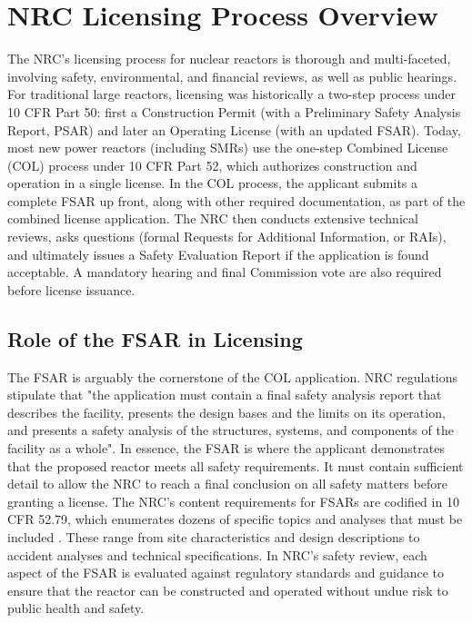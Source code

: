 \documentclass[5p,authoryear]{elsarticle}
\begin{document}
\section{NRC Licensing Process Overview} \label{NRC Licensing Process Overview}

The NRC’s licensing process for nuclear reactors is thorough and multi-faceted, involving safety, environmental, and financial reviews, as well as public hearings. For traditional large reactors, licensing was historically a two-step process under 10 CFR Part 50: first a Construction Permit (with a Preliminary Safety Analysis Report, PSAR) and later an Operating License (with an updated FSAR). Today, most new power reactors (including SMRs) use the one-step Combined License (COL) process under 10 CFR Part 52, which authorizes construction and operation in a single license. In the COL process, the applicant submits a complete FSAR up front, along with other required documentation, as part of the combined license application. The NRC then conducts extensive technical reviews, asks questions (formal Requests for Additional Information, or RAIs), and ultimately issues a Safety Evaluation Report if the application is found acceptable. A mandatory hearing and final Commission vote are also required before license issuance.

\subsection{Role of the FSAR in Licensing}
\vspace{0.2cm}

The FSAR is arguably the cornerstone of the COL application. NRC regulations stipulate that "the application must contain a final safety analysis report that describes the facility, presents the design bases and the limits on its operation, and presents a safety analysis of the structures, systems, and components of the facility as a whole". In essence, the FSAR is where the applicant demonstrates that the proposed reactor meets all safety requirements. It must contain sufficient detail to allow the NRC to reach a final conclusion on all safety matters before granting a license. The NRC's content requirements for FSARs are codified in 10 CFR 52.79, which enumerates dozens of specific topics and analyses that must be included \citep{CFR52.79}. These range from site characteristics and design descriptions to accident analyses and technical specifications. In NRC's safety review, each aspect of the FSAR is evaluated against regulatory standards and guidance to ensure that the reactor can be constructed and operated without undue risk to public health and safety.
\end{document}
